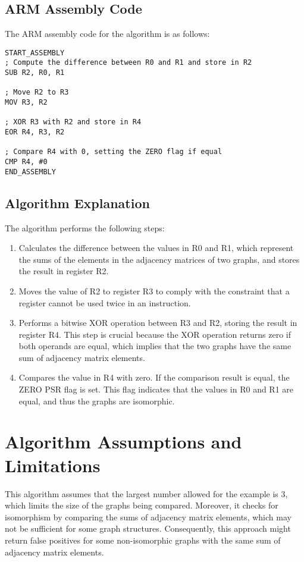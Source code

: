 \subsection{ARM Assembly Code}

The ARM assembly code for the algorithm is as follows:

\begin{verbatim}
START_ASSEMBLY
; Compute the difference between R0 and R1 and store in R2
SUB R2, R0, R1

; Move R2 to R3
MOV R3, R2

; XOR R3 with R2 and store in R4
EOR R4, R3, R2

; Compare R4 with 0, setting the ZERO flag if equal
CMP R4, #0
END_ASSEMBLY
\end{verbatim}

\subsection{Algorithm Explanation}

The algorithm performs the following steps:

\begin{enumerate}
\item Calculates the difference between the values in R0 and R1, which represent the sums of the elements in the adjacency matrices of two graphs, and stores the result in register R2.
\item Moves the value of R2 to register R3 to comply with the constraint that a register cannot be used twice in an instruction.
\item Performs a bitwise XOR operation between R3 and R2, storing the result in register R4. This step is crucial because the XOR operation returns zero if both operands are equal, which implies that the two graphs have the same sum of adjacency matrix elements.
\item Compares the value in R4 with zero. If the comparison result is equal, the ZERO PSR flag is set. This flag indicates that the values in R0 and R1 are equal, and thus the graphs are isomorphic.
\end{enumerate}

\section{Algorithm Assumptions and Limitations}

This algorithm assumes that the largest number allowed for the example is 3, which limits the size of the graphs being compared. Moreover, it checks for isomorphism by comparing the sums of adjacency matrix elements, which may not be sufficient for some graph structures. Consequently, this approach might return false positives for some non-isomorphic graphs with the same sum of adjacency matrix elements.

